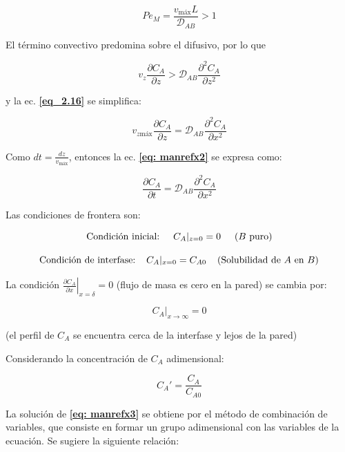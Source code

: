 $$Pe_M = \frac{v_{\text{máx}} L}{\mathscr{D}_{AB}} > 1$$

El término convectivo predomina sobre el difusivo, por lo que

$$v_z \frac{\partial C_A}{\partial z} > \mathscr{D}_{AB} \frac{\partial^2 C_A}{\partial z^2}$$

y la ec. \textbf{\eqref{eq_2.16}} se simplifica:

\begin{equation} \label{eq: manrefx2}
v_{z \text{máx}} \frac{\partial C_A}{\partial z} = \mathscr{D}_{AB} \frac{\partial^2 C_A}{\partial x^2}
\end{equation}

Como $dt = \frac{dz}{v_{\text{máx}}}$, entonces la ec. \textbf{\eqref{eq: manrefx2}} se expresa como:

\begin{equation} \label{eq: manrefx3}
	\frac{\partial C_A}{\partial t} = \mathscr{D}_{AB} \frac{\partial^2 C_A}{\partial x^2}
\end{equation}

Las condiciones de frontera son:

\begin{equation}
	\text{Condición inicial:} \hspace{0.5cm} C_A|_{z=0} = 0 \hspace{0.5cm} \text{($B$ puro)}
\end{equation}

\begin{equation}
	 \text{Condición de interfase:} \hspace{0.4cm} C_A|_{x=0} = C_{A0} \hspace{0.4cm} \text{(Solubilidad de $A$ en $B$)}
\end{equation}

La condición $\left. \frac{\partial C_A}{\partial x} \right|_{x = \delta} = 0$ (flujo de masa es cero en la pared) se cambia por:

\begin{equation}
	C_A|_{x \to \infty} = 0
\end{equation}

(el perfil de $C_A$ se encuentra cerca de la interfase y lejos de la pared)

Considerando la concentración de $C_A$ adimensional:

\begin{equation}
	C_A' = \frac{C_A}{C_{A0}}
\end{equation}

La solución de \textbf{\eqref{eq: manrefx3}} se obtiene por el método de combinación de variables, que consiste en formar un grupo adimensional con las variables de la ecuación. Se sugiere la siguiente relación:

